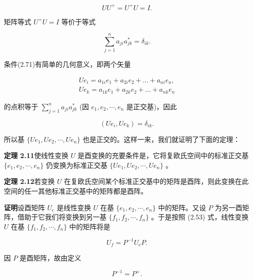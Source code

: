 \begin{equation*}
U U ^ {+} = U ^ {+} U = I.
\end{equation*}

矩阵等式 $U^{+}U = I$ 等价于等式

\begin{equation*}
\sum_ {j = 1} ^ {n} a _ {j i} a _ {j k} ^ {*} = \delta_ {i k}.\tag{2.71}
\end{equation*}

条件(2.71)有简单的几何意义，即两个矢量

\begin{equation*}
\begin{array}{l} U e _ {i} = a _ {1 i} e _ {1} + a _ {2 i} e _ {2} + \dots + a _ {n i} e _ {n}, \\ U e _ {k} = a _ {1 k} e _ {1} + a _ {2 k} e _ {2} + \dots + a _ {n k} e _ {n} \end{array}
\end{equation*}

的点积等于 $\sum_{j=1}^{n}a_{ji}a_{jk}^{*}$ (因 $e_{1}, e_{2}, \cdots, e_{n}$ 是正交基)，因此

\begin{equation*}
(U e _ {i}, U e _ {k}) = \delta_ {i k}.\tag{2.72}
\end{equation*}

所以基 $\{Ue_{1}, Ue_{2}, \cdots, Ue_{n}\}$ 也是正交的。这样一来，我们就证明了下面的定理：

\textbf{定理 2.11}\quad 使线性变换 $U$ 是酉变换的充要条件是，它将复欧氏空间中的标准正交基 $\{e_{1}, e_{2}, \cdots, e_{n}\}$ 仍变换为标准正交基 $\{Ue_{1}, Ue_{2}, \cdots, Ue_{n}\}$ 。

\textbf{定理 2.12}\quad 若变换 $U$ 在复欧氏空间某个标准正交基中的矩阵是酉阵，则此变换在此空间的任一其他标准正交基中的矩阵都是酉阵。

\textbf{证明}\quad 设酉矩阵 $U_{e}$ 是线性变换 $U$ 在基 $\{e_{1}, e_{2}, \cdots, e_{n}\}$ 中的矩阵。又设 $P$ 为另一酉矩阵，借助于它我们将变换到另一基 $\{f_{1}, f_{2}, \cdots, f_{n}\}$ 。于是按照 (2.53) 式，线性变换 $U$ 在基 $\{f_{1}, f_{2}, \cdots, f_{n}\}$ 中的矩阵将是

\begin{equation*}
U _ {f} = P ^ {- 1} U _ {e} P.\tag{2.73}
\end{equation*}

因 $P$ 是酉矩阵，故由定义

\begin{equation*}
P ^ {- 1} = P ^ {+}.
\end{equation*}

